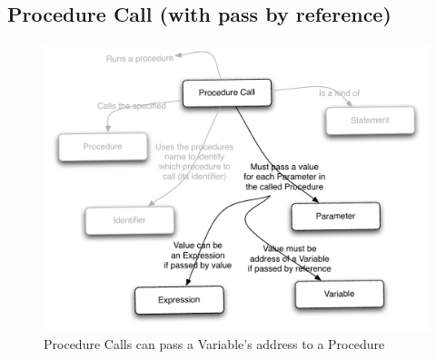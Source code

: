 \clearpage
\subsection{Procedure Call (with pass by reference)} %
\label{sub:procedure_call_with_pass_by_reference_}

\begin{figure}[h]
   \centering
   \includegraphics[width=\textwidth]{./topics/parameters/diagrams/ProcedureCall} 
   \caption{Procedure Calls can pass a Variable's address to a Procedure}
   \label{fig:parameters-procedure-call}
\end{figure}


